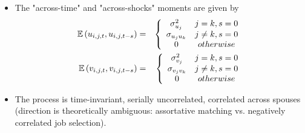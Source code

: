\documentclass[notes=show]{beamer}
\begin{document}
\begin{frame}%



\begin{itemize}
\item The "across-time" and "across-shocks" moments are given by%
\begin{eqnarray}
\mathbb{E}\left( u_{i,j,t},u_{i,j,t-s}\right) &=&\left\{ 
\begin{array}{cc}
\sigma _{u_{j}}^{2} & j=k,s=0 \\ 
\sigma _{u_{j}u_{k}} & j\neq k,s=0 \\ 
0 & otherwise%
\end{array}%
\right. \\
\mathbb{E}\left( v_{i,j,t},v_{i,j,t-s}\right) &=&\left\{ 
\begin{array}{cc}
\sigma _{v_{j}}^{2} & j=k,s=0 \\ 
\sigma _{v_{j}v_{k}} & j\neq k,s=0 \\ 
0 & otherwise%
\end{array}%
\right.  \notag
\end{eqnarray}

\item The process is time-invariant, serially uncorrelated, correlated
across spouses (direction is theoretically ambiguous: assortative matching
vs. negatively correlated job selection).
\end{itemize}

\transboxout%
\end{frame}%

\bigskip
\end{document}
